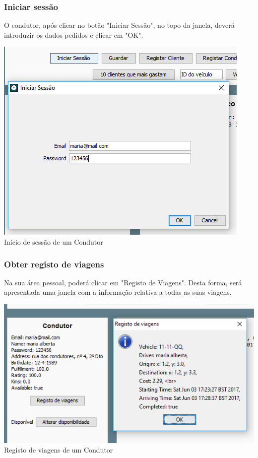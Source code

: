 \documentclass[a4paper]{article}
\begin{document}
\subsubsection{Iniciar sessão}
O condutor, após clicar no botão "Iniciar Sessão", no topo da janela, deverá introduzir os dados pedidos e clicar em "OK".
\begin{center}
  \includegraphics[scale=0.75]{cliente_iniciarsessao}\\
  \caption{Início de sessão de um Condutor}
  \label{fig:picture}
\end{center}
\subsubsection{Obter registo de viagens}
Na sua área pessoal, poderá clicar em "Registo de Viagens". Desta forma, será apresentada uma janela com a informação relativa a todas as suas viagens.
\begin{center}
  \includegraphics[scale=0.75]{condutor_registo}\\
  \caption{Registo de viagens de um Condutor}
  \label{fig:picture}
\end{center}
\end{document}
